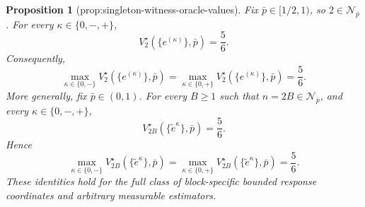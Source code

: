 \documentclass{article}
\newtheorem{proposition}{Proposition}
\begin{document}
\begin{proposition}[prop:singleton-witness-oracle-values]\label{prop:singleton-witness-oracle-values}
Fix \(\bar p\in[1/2,1)\), so \(2\in\mathcal N_{\bar p}\). For every \(\kappa\in\{0,-,+\}\),
\[
 V_2^\star(\{e^{(\kappa)}\},\bar p)=\frac56.
\]
Consequently,
\[
 \max_{\kappa\in\{0,-\}}V_2^\star(\{e^{(\kappa)}\},\bar p)
 =\max_{\kappa\in\{0,+\}}V_2^\star(\{e^{(\kappa)}\},\bar p)
 =\frac56.
\]
More generally, fix \(\bar p\in(0,1)\). For every \(B\ge1\) such that \(n=2B\in\mathcal N_{\bar p}\), and every \(\kappa\in\{0,-,+\}\),
\[
 V_{2B}^\star(\{\widetilde e^\kappa\},\bar p)=\frac56.
\]
Hence
\[
 \max_{\kappa\in\{0,-\}}V_{2B}^\star(\{\widetilde e^\kappa\},\bar p)
 =\max_{\kappa\in\{0,+\}}V_{2B}^\star(\{\widetilde e^\kappa\},\bar p)
 =\frac56.
\]
These identities hold for the full class of block-specific bounded response coordinates and arbitrary measurable estimators.
\end{proposition}
\end{document}
